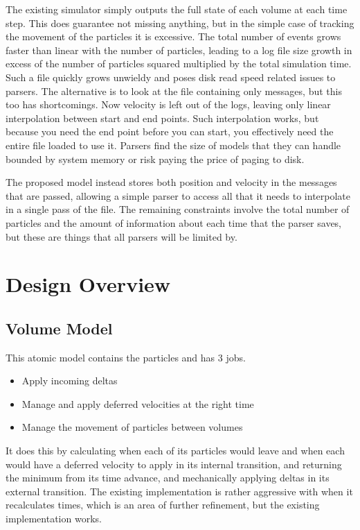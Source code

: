 \documentclass[conference]{IEEEtran}
\begin{document}
The existing simulator simply outputs the full state of each volume at each time step. This does guarantee not missing anything, but in the simple case of tracking the movement of the particles it is excessive. The total number of events grows faster than linear with the number of particles, leading to a log file size growth in excess of the number of particles squared multiplied by the total simulation time. Such a file quickly grows unwieldy and poses disk read speed related issues to parsers. The alternative is to look at the file containing only messages, but this too has shortcomings. Now velocity is left out of the logs, leaving only linear interpolation between start and end points. Such interpolation works, but because you need the end point before you can start, you effectively need the entire file loaded to use it. Parsers find the size of models that they can handle bounded by system memory or risk paying the price of paging to disk.

The proposed model instead stores both position and velocity in the messages that are passed, allowing a simple parser to access all that it needs to interpolate in a single pass of the file. The remaining constraints involve the total number of particles and the amount of information about each time that the parser saves, but these are things that all parsers will be limited by.


\section{Design Overview}

\subsection{Volume Model}

This atomic model contains the particles and has 3 jobs.

\begin{itemize}
	\item Apply incoming deltas
	\item Manage and apply deferred velocities at the right time
	\item Manage the movement of particles between volumes
\end{itemize}

It does this by calculating when each of its particles would leave and when each would have a deferred velocity to apply in its internal transition, and returning the minimum from its time advance, and mechanically applying deltas in its external transition. The existing implementation is rather aggressive with when it recalculates times, which is an area of further refinement, but the existing implementation works. 
\end{document}
